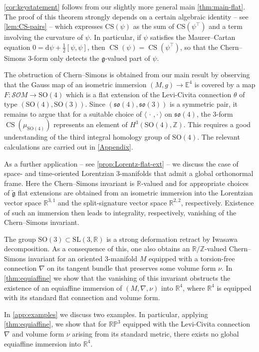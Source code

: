 \documentclass[british,11pt,a4paper]{amsart}
\numberwithin{equation}{section}
\renewcommand\Bbb{\mathbb}
\newcommand{\B}[2]{\langle#1,#2\rangle}
\newcommand{\CS}{\operatorname{CS}}
\newcommand{\tfg}{\widetilde{\mathfrak g}}
\newcommand{\Z}{\mathbb{Z}}
\renewcommand*{\d}{\mathrm{d}}
\newcommand*{\R}{\mathbb{R}}
\newcounter{theorem}
\numberwithin{theorem}{section}
\theoremstyle{definition}
\theoremstyle{remark}
\begin{document}
\cref{cor:keystatement} follows from our slightly more general main \cref{thm:main-flat}. The proof of this theorem strongly depends on a certain algebraic identity -- see \cref{lem:CS-pairs} -- which expresses $\mathrm{CS}(\psi)$ as the sum of $\mathrm{CS}(\psi^{\top})$ and a term involving the curvature of $\psi$. In particular, if $\psi$ satisfies the Maurer--Cartan equation $0=\d\psi+\tfrac{1}{2}[\psi,\psi]$, then $\CS(\psi)=\CS(\psi^{\top})$, so that the Chern--Simons $3$-form only detects the $\mathfrak{g}$-valued part of $\psi$.  

The obstruction of Chern--Simons is obtained from our main result by observing that the Gauss map of an isometric immersion $(M,g) \to \mathbb{E}^4$ is covered by a map $F : \mathcal{SO}M \to \mathrm{SO}(4)$ which is a flat extension of the Levi-Civita connection $\theta$ of type $(\mathrm{SO}(4),\mathrm{SO}(3))$. Since $(\mathfrak{so}(4),\mathfrak{so}(3))$ is a symmetric pair, it remains to argue that for a suitable choice of $\B{\,\cdot\,}{\cdot\,}$ on $\mathfrak{so}(4)$, the $3$-form $\CS(\mu_{\mathrm{SO}(4)})$ represents an element of $H^3(\mathrm{SO}(4),\Z)$. This requires a good understanding of the third integral homology group of $\mathrm{SO}(4)$. The relevant calculations are carried out in \cref{Appendix}. 

As a further application  -- see \cref{prop:Lorentz-flat-ext} --  we discuss the case of space- and time-oriented Lorentzian $3$-manifolds that admit a global orthonormal frame. Here the Chern--Simons invariant is $\R$-valued and for appropriate choices of $\tfg$ flat extensions are obtained from an isometric immersion into the Lorentzian vector space $\Bbb R^{3,1}$ and the split-signature vector space $\Bbb R^{2,2}$, respectively. Existence of such an immersion then leads to integrality, respectively, vanishing of the Chern--Simons invariant. 

The group $\mathrm{SO}(3)\subset \mathrm{SL}(3,\R)$ is a strong deformation retract by Iwasawa decomposition. As a consequence of this, one also obtains an $\R/\Z$-valued Chern--Simons invariant for an oriented $3$-manifold $M$ equipped with a torsion-free connection $\nabla$ on its tangent bundle that preserves some volume form $\nu$. In \cref{thm:equiaffine} we show that the vanishing of this invariant obstructs the existence of an equiaffine immersion of $(M,\nabla,\nu)$ into $\R^4$, where $\R^4$ is equipped with its standard flat connection and volume form.   

In \cref{app:examples} we discuss two examples. In particular, applying \cref{thm:equiaffine}, we show that for $\mathbb{RP}^3$ equipped with the Levi-Civita connection $\nabla$ and volume form $\nu$ arising from its standard metric, there exists no global equiaffine immersion into $\R^4$. 
\end{document}

